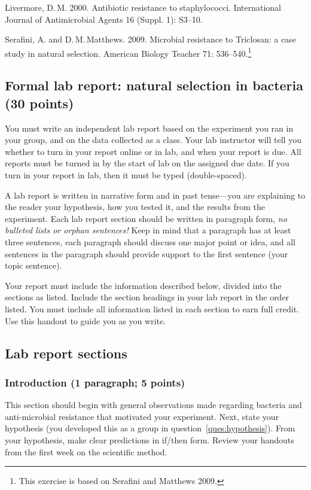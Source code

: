 \documentclass[12pt]{exam}
\newlength{\litindent}
\begin{document}
Livermore, D.\,M. 2000. Antibiotic resistance to staphylococci. International Journal of Antimicrobial Agents 16 (Suppl. 1): S3–10.

Serafini, A. and D.\,M.\,Matthews. 2009. Microbial resistance to Triclosan: a case study in natural selection. American Biology Teacher 71: 536–540.\footnote{This exercise is based on Serafini and Matthews 2009.}


\subsection*{Formal lab report: natural selection in bacteria (30 points)}

You must write an independent lab report based on
the experiment you ran in your group, and on the data collected as a
class. Your lab instructor will tell you whether to turn in your report online or in lab, and when your report is due. All reports must be turned in by the start of lab on the assigned due date. If you turn in your report in lab, then it must be typed (double-spaced).  

A lab report is written in narrative form and in past tense—you are
explaining to the reader your hypothesis, how you tested it, and the
results from the experiment. Each lab report section should be written
in paragraph form, \emph{no bulleted lists or orphan sentences!} Keep in
mind that a paragraph has at least three sentences, each paragraph should
discuss one major point or idea, and all sentences in the paragraph
should provide support to the first sentence (your topic sentence).

Your report must include the information described below, divided into the
sections as listed. Include the section headings in your lab report in the order listed. You must 
include all information listed in each section to earn full credit. 
Use this handout to guide you as you write.

\subsection*{Lab report sections}

\subsubsection*{Introduction (1 paragraph; 5 points)} 

This section should begin with general observations made regarding
bacteria and anti-microbial resistance that motivated your experiment.
Next, state your hypothesis (you developed this as a group in question~\ref{ques:hypothesis}).
From your hypothesis, make clear predictions in if/then form. Review your handouts from
the first week on the scientific method.
\end{document}
